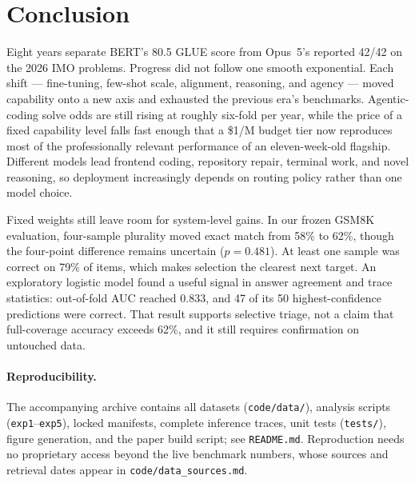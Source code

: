 \section{Conclusion}\label{sec:conclusion}

Eight years separate BERT's 80.5 GLUE score from Opus~5's reported 42/42 on
the 2026 IMO problems. Progress did not follow one smooth exponential. Each
shift --- fine-tuning, few-shot scale, alignment, reasoning, and agency ---
moved capability onto a new axis and exhausted the previous era's benchmarks.
Agentic-coding solve odds are still rising at roughly six-fold per year, while
the price of a fixed capability level falls fast enough that a \$1/M budget
tier now reproduces most of the professionally relevant performance of an
eleven-week-old flagship. Different models lead frontend coding, repository
repair, terminal work, and novel reasoning, so deployment increasingly depends
on routing policy rather than one model choice.

Fixed weights still leave room for system-level gains. In our frozen GSM8K
evaluation, four-sample plurality moved exact match from 58\% to 62\%, though
the four-point difference remains uncertain ($p=0.481$). At least one sample
was correct on 79\% of items, which makes selection the clearest next target.
An exploratory logistic model found a useful signal in answer agreement and
trace statistics: out-of-fold AUC reached 0.833, and 47 of its 50
highest-confidence predictions were correct. That result supports selective
triage, not a claim that full-coverage accuracy exceeds 62\%, and it still
requires confirmation on untouched data.

\paragraph{Reproducibility.} The accompanying archive contains all
datasets (\texttt{code/data/}), analysis scripts
(\texttt{exp1}--\texttt{exp5}), locked manifests, complete inference traces,
unit tests (\texttt{tests/}), figure generation, and the paper build script;
see \texttt{README.md}. Reproduction needs no proprietary access beyond the
live benchmark numbers, whose sources and retrieval dates appear in
\texttt{code/data\_sources.md}.
